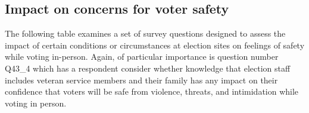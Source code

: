 \documentclass[
  11pt,
  a4paper,
]{article}
\begin{document}
\subsection{Impact on concerns for voter
safety}\label{impact-on-concerns-for-voter-safety}

The following table examines a set of survey questions designed to
assess the impact of certain conditions or circumstances at election
sites on feelings of safety while voting in-person. Again, of particular
importance is question number Q43\_4 which has a respondent consider
whether knowledge that election staff includes veteran service members
and their family has any impact on their confidence that voters will be
safe from violence, threats, and intimidation while voting in person.

\begin{table}

\caption{\label{tbl-t5}}

\end{table}
\end{document}
